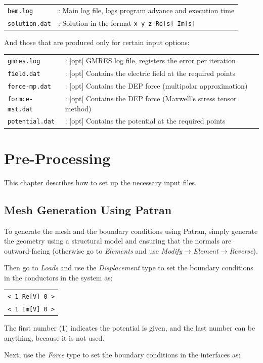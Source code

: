 \documentclass[12pt]{report}
\begin{document}
\begin{tabular}{ll}
\texttt{bem.log}&: Main log file, logs program advance and execution time\\
\texttt{solution.dat}&: Solution in the format \texttt{x y z Re[s] Im[s]}
\end{tabular}

And those that are produced only for certain input options:

\begin{tabular}{ll}
\texttt{gmres.log}&: [opt] GMRES log file, registers the error per iteration\\
\texttt{field.dat}&: [opt] Contains the electric field at the required points\\
\texttt{force-mp.dat}&: [opt] Contains the DEP force (multipolar approximation)\\
\texttt{formce-mst.dat}&: [opt] Contains the DEP force (Maxwell's stress tensor method)\\
\texttt{potential.dat}&: [opt] Contains the potential at the required points\\
\end{tabular}
\pagebreak

\chapter{Pre-Processing}
This chapter describes how to set up the necessary input files.

\section{Mesh Generation Using Patran}
To generate the mesh and the boundary conditions using Patran, simply generate the geometry using a structural model and ensuring that the normals are outward-facing (otherwise go to {\it Elements} and use {\it Modify$\rightarrow$Element$\rightarrow$Reverse}).

Then go to {\it Loads} and use the {\it Displacement} type to set the boundary conditions in the conductors in the system as:

\begin{tabular}{l}
\texttt{< 1 Re[V] 0 >}\\
\texttt{< 1 Im[V] 0 >}
\end{tabular}

The first number (1) indicates the potential is given, and the last number can be anything, because it is not used.

Next, use the {\it Force} type to set the boundary conditions in the interfaces as:
\end{document}
